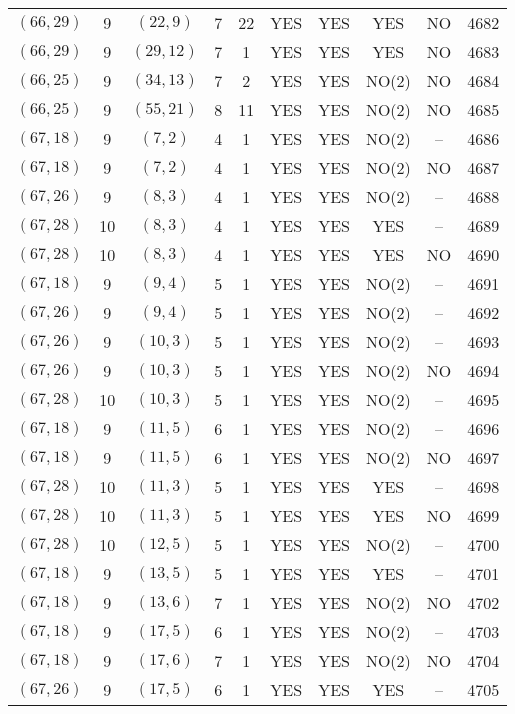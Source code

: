 \begin{longtable}{|c|c|c|c|c|c|c|c|c|c|}
$(66, 29)$ & 9 & $(22, 9)$ & 7 & 22 & YES & YES & YES & NO & 4682\\
$(66, 29)$ & 9 & $(29, 12)$ & 7 & 1 & YES & YES & YES & NO & 4683\\
$(66, 25)$ & 9 & $(34, 13)$ & 7 & 2 & YES & YES & NO(2) & NO & 4684\\
$(66, 25)$ & 9 & $(55, 21)$ & 8 & 11 & YES & YES & NO(2) & NO & 4685\\
$(67, 18)$ & 9 & $(7, 2)$ & 4 & 1 & YES & YES & NO(2) & -- & 4686\\
$(67, 18)$ & 9 & $(7, 2)$ & 4 & 1 & YES & YES & NO(2) & NO & 4687\\
$(67, 26)$ & 9 & $(8, 3)$ & 4 & 1 & YES & YES & NO(2) & -- & 4688\\
$(67, 28)$ & 10 & $(8, 3)$ & 4 & 1 & YES & YES & YES & -- & 4689\\
$(67, 28)$ & 10 & $(8, 3)$ & 4 & 1 & YES & YES & YES & NO & 4690\\
$(67, 18)$ & 9 & $(9, 4)$ & 5 & 1 & YES & YES & NO(2) & -- & 4691\\
$(67, 26)$ & 9 & $(9, 4)$ & 5 & 1 & YES & YES & NO(2) & -- & 4692\\
$(67, 26)$ & 9 & $(10, 3)$ & 5 & 1 & YES & YES & NO(2) & -- & 4693\\
$(67, 26)$ & 9 & $(10, 3)$ & 5 & 1 & YES & YES & NO(2) & NO & 4694\\
$(67, 28)$ & 10 & $(10, 3)$ & 5 & 1 & YES & YES & NO(2) & -- & 4695\\
$(67, 18)$ & 9 & $(11, 5)$ & 6 & 1 & YES & YES & NO(2) & -- & 4696\\
$(67, 18)$ & 9 & $(11, 5)$ & 6 & 1 & YES & YES & NO(2) & NO & 4697\\
$(67, 28)$ & 10 & $(11, 3)$ & 5 & 1 & YES & YES & YES & -- & 4698\\
$(67, 28)$ & 10 & $(11, 3)$ & 5 & 1 & YES & YES & YES & NO & 4699\\
$(67, 28)$ & 10 & $(12, 5)$ & 5 & 1 & YES & YES & NO(2) & -- & 4700\\
$(67, 18)$ & 9 & $(13, 5)$ & 5 & 1 & YES & YES & YES & -- & 4701\\
$(67, 18)$ & 9 & $(13, 6)$ & 7 & 1 & YES & YES & NO(2) & NO & 4702\\
$(67, 18)$ & 9 & $(17, 5)$ & 6 & 1 & YES & YES & NO(2) & -- & 4703\\
$(67, 18)$ & 9 & $(17, 6)$ & 7 & 1 & YES & YES & NO(2) & NO & 4704\\
$(67, 26)$ & 9 & $(17, 5)$ & 6 & 1 & YES & YES & YES & -- & 4705\\

\end{longtable}
